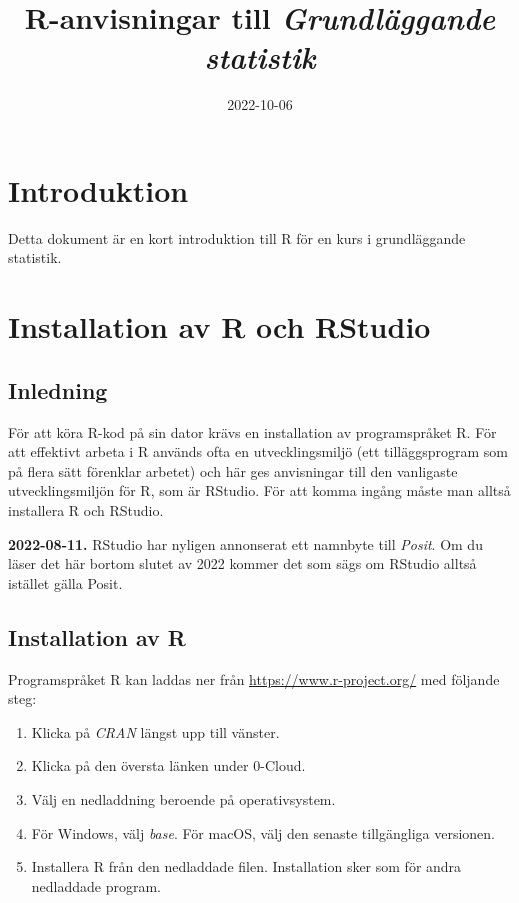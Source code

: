 \documentclass[
]{book}
\title{R-anvisningar till \emph{Grundläggande statistik}}
\author{}
\date{\vspace{-2.5em}2022-10-06}
\providecommand{\tightlist}{%
  \setlength{\itemsep}{0pt}\setlength{\parskip}{0pt}}
\theoremstyle{definition}
\theoremstyle{definition}
\theoremstyle{definition}
\theoremstyle{definition}
\theoremstyle{remark}
\begin{document}
\maketitle

{
\setcounter{tocdepth}{1}
\tableofcontents
}
\hypertarget{introduktion}{%
\chapter*{Introduktion}\label{introduktion}}

Detta dokument är en kort introduktion till R för en kurs i grundläggande statistik.

\hypertarget{installation-av-r-och-rstudio}{%
\chapter*{Installation av R och RStudio}\label{installation-av-r-och-rstudio}}

\hypertarget{inledning}{%
\section{Inledning}\label{inledning}}

För att köra R-kod på sin dator krävs en installation av programspråket R. För att effektivt arbeta i R används ofta en utvecklingsmiljö (ett tilläggsprogram som på flera sätt förenklar arbetet) och här ges anvisningar till den vanligaste utvecklingsmiljön för R, som är RStudio. För att komma ingång måste man alltså installera R och RStudio.

\textbf{2022-08-11.} RStudio har nyligen annonserat ett namnbyte till \emph{Posit}. Om du läser det här bortom slutet av 2022 kommer det som sägs om RStudio alltså istället gälla Posit.

\hypertarget{installation-av-r}{%
\section{Installation av R}\label{installation-av-r}}

Programspråket R kan laddas ner från \url{https://www.r-project.org/} med följande steg:

\begin{enumerate}
\def\labelenumi{\arabic{enumi}.}
\tightlist
\item
  Klicka på \emph{CRAN} längst upp till vänster.
\item
  Klicka på den översta länken under 0-Cloud.
\item
  Välj en nedladdning beroende på operativsystem.
\item
  För Windows, välj \emph{base}. För macOS, välj den senaste tillgängliga versionen.
\item
  Installera R från den nedladdade filen. Installation sker som för andra nedladdade program.
\end{enumerate}
\end{document}
